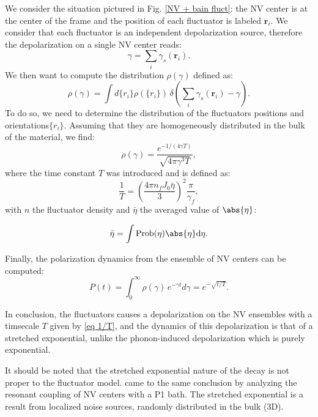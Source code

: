 \documentclass[a4paper,11pt]{report}
\begin{document}
We consider the situation pictured in Fig. \ref{NV + bain fluct}: the NV center is at the center of the frame and the position of each fluctuator is labeled $\mathbf{r}_i$. We consider that each fluctuator is an independent depolarization source, therefore the depolarization on a single NV center reads: 
\begin{equation}
\gamma=\sum_i \gamma_s(\mathbf{r}_i).
\end{equation}
We then want to compute the distribution $\rho(\gamma)$ defined as:
\begin{equation}
\rho(\gamma)=\int d\{r_i\} \rho(\{r_i\})\, \delta \left( \sum_i \gamma_s(\mathbf{r}_i) - \gamma \right).
\end{equation}
To do so, we need to determine the distribution of the fluctuators positions and orientations$\{r_i\}$. Assuming that they are homogeneously distributed in the bulk of the material, we find:
\begin{equation}
\rho(\gamma)=\frac{e^{-1/(4\gamma T)}}{\sqrt{4\pi \gamma^3 T}},
\end{equation}
where the time constant $T$ was introduced and is defined as:
\begin{equation}
\frac{1}{T}=\left(\frac{4\pi n_fJ_0\bar \eta}{3}\right)^2 \frac{\pi}{\gamma_f},
\label{eq 1/T}
\end{equation}
with $n$ the fluctuator density and $\bar \eta$ the averaged value of $\abs{\eta}$: 

\begin{equation}
\bar \eta = \int \rm{Prob}(\eta) \abs{\eta} d\eta.
\end{equation}

Finally, the polarization dynamics from the ensemble of NV centers can be computed:
\begin{equation}
P(t)=\int_0^\infty \rho(\gamma)\, e^{-\gamma t}d\gamma= e^{-\sqrt{t/T}}.
\end{equation}

In conclusion, the fluctuators causes a depolarization on the NV ensembles with a timsecale $T$ given by \ref{eq 1/T}, and the dynamics of this depolarization is that of a stretched exponential, unlike the phonon-induced depolarization which is purely exponential. 

It should be noted that the stretched exponential nature of the decay is not proper to the fluctuator model. \citep{hall2016detection} came to the same conclusion by analyzing the resonant coupling of NV centers with a P1 bath. The stretched exponential is a result from localized noise sources, randomly distributed in the bulk (3D).
\end{document}
